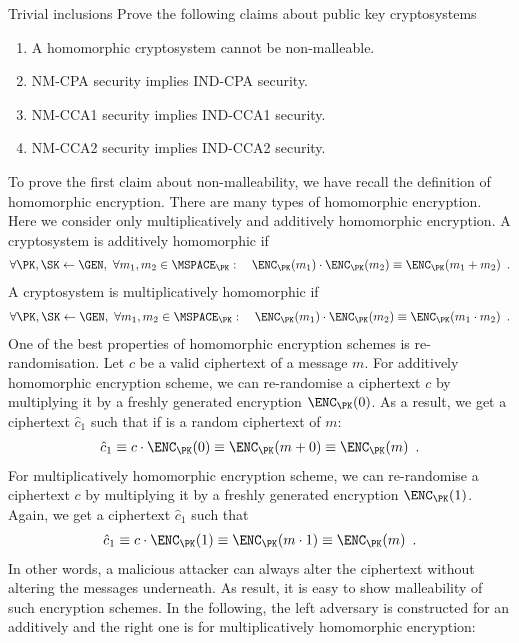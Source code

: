\documentclass{crypto-exercise}
\author{Sven Laur}
\begin{document}
\begin{exercise}{Trivial inclusions}
Prove the following claims about public key cryptosystems
  \begin{enumerate}
  \item A homomorphic cryptosystem cannot be non-malleable.
  \item NM-CPA security implies IND-CPA security.
  \item NM-CCA1 security implies IND-CCA1 security.
  \item NM-CCA2 security implies IND-CCA2 security.
  \end{enumerate}\end{exercise}

\begin{solution}
To prove the first claim about non-malleability, we have recall the definition of homomorphic encryption. There are many types of homomorphic encryption. Here we consider only multiplicatively and additively homomorphic encryption. A cryptosystem is additively homomorphic if 
\begin{align*}
\forall \PK,\SK\gets\GEN,\ \forall m_1,m_2\in\MSPACE_\PK:\quad\ENC_\PK(m_1)\cdot\ENC_\PK(m_2)\equiv\ENC_\PK(m_1+m_2)\enspace.
\end{align*}
A cryptosystem is multiplicatively homomorphic if 
\begin{align*}
\forall \PK,\SK\gets\GEN,\ \forall m_1,m_2\in\MSPACE_\PK:\quad\ENC_\PK(m_1)\cdot\ENC_\PK(m_2)\equiv\ENC_\PK(m_1\cdot m_2)\enspace.
\end{align*}
One of the best properties of homomorphic encryption schemes is re-randomisation. Let $c$ be a valid ciphertext of a message $m$. For additively homomorphic encryption scheme, we can re-randomise a ciphertext $c$ by multiplying it by a freshly generated encryption $\ENC_\PK(0)$. As a result, we get a ciphertext $\hat{c}_1$ such that if is a random ciphertext of $m$:
\begin{align*}
 \hat{c}_1\equiv c\cdot\ENC_\PK(0)\equiv\ENC_\PK(m+0)\equiv\ENC_\PK(m)\enspace.
\end{align*}    
For multiplicatively homomorphic encryption scheme, we can re-randomise a ciphertext $c$ by multiplying it by a freshly generated encryption $\ENC_\PK(1)$. Again, we get a ciphertext $\hat{c}_1$ such that
\begin{align*}
 \hat{c}_1\equiv c\cdot\ENC_\PK(1)\equiv\ENC_\PK(m\cdot 1)\equiv\ENC_\PK(m)\enspace.
\end{align*}    
In other words, a malicious attacker can always alter the ciphertext without altering the messages underneath. As result, it is easy to show malleability of such encryption schemes. In the following, the left adversary is constructed for an additively and the right one is  for multiplicatively homomorphic encryption:

\end{solution}
\end{document}
